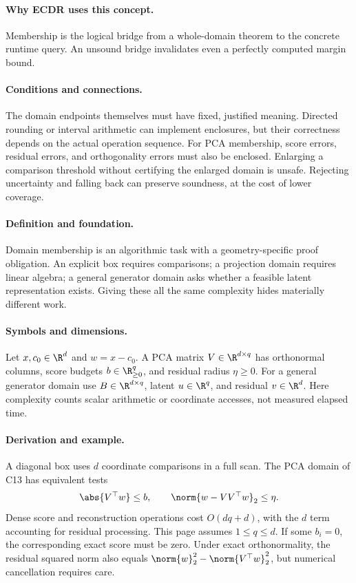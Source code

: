 \paragraph{Why ECDR uses this concept.}
Membership is the logical bridge from a whole-domain theorem to the concrete runtime query. An unsound bridge invalidates even a perfectly computed margin bound.
\paragraph{Conditions and connections.}
The domain endpoints themselves must have fixed, justified meaning. Directed rounding or interval arithmetic can implement enclosures, but their correctness depends on the actual operation sequence. For PCA membership, score errors, residual errors, and orthogonality errors must also be enclosed. Enlarging a comparison threshold without certifying the enlarged domain is unsafe. Rejecting uncertainty and falling back can preserve soundness, at the cost of lower coverage.

\paragraph{Definition and foundation.}
Domain membership is an algorithmic task with a geometry-specific proof obligation. An explicit box requires comparisons; a projection domain requires linear algebra; a general generator domain asks whether a feasible latent representation exists. Giving these all the same complexity hides materially different work.
\paragraph{Symbols and dimensions.}
Let $x,c_0\in\R^d$ and $w=x-c_0$. A PCA matrix $V\in\R^{d\times q}$ has orthonormal columns, score budgets $b\in\R^q_{\ge0}$, and residual radius $\eta\ge0$. For a general generator domain use $B\in\R^{d\times q}$, latent $u\in\R^q$, and residual $v\in\R^d$. Here complexity counts scalar arithmetic or coordinate accesses, not measured elapsed time.
\paragraph{Derivation and example.}
A diagonal box uses $d$ coordinate comparisons in a full scan. The PCA domain of C13 has equivalent tests
\[
 \abs{V^\top w}\le b,\qquad
 \norm{w-VV^\top w}_2\le\eta.
\]
Dense score and reconstruction operations cost $O(dq+d)$, with the $d$ term accounting for residual processing. This page assumes $1\le q\le d$. If some $b_i=0$, the corresponding exact score must be zero. Under exact orthonormality, the residual squared norm also equals $\norm{w}_2^2-\norm{V^\top w}_2^2$, but numerical cancellation requires care.
